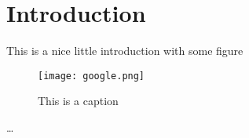 
\chapter{Introduction}
\label{ch:Introduction}

This is a nice little introduction with some figure
\begin{figure}[htp]
\begin{center}
  \texttt{[image: google.png]}
\caption{This is a caption}
\end{center}
\end{figure} 

\cite{becker2008a}
\dots

